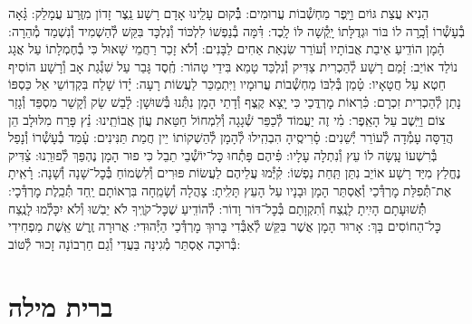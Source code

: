 \documentclass[twoside, openany, parskip=half, 11pt]{book}
\begin{document}
הֵנִיא עֲצַת גּוֹיִם וַיָּֽפֶר מַחְשְׁ֯בוֹת עֲרוּמִים: \hfill \break
בְּ֯֗קוּם עָלֵֽינוּ אָדָם רָשָׁע נֵֽצֶר זָדוֹן מִזֶּֽרַע עֲמָלֵק: \hfill \break
גָּ֗אָה בְ֯עָשְׁ֯רוֹ וְ֯כָֽרָה לוֹ בּוֹר וּגְדֻלָּתוֹ יָֽקְ֯שָׁה לּוֹ לָֽכֶד: \hfill \break
דִּ֗מָּה בְ֯נַפְשׁוֹ לִלְכּוֹד וְ֯נִלְכָּד בִּקֵּשׁ לְ֯הַשְׁמִיד וְ֯נִשְׁמַד מְ֯הֵרָה: \hfill \break
הָ֗מָן הוֹדִֽיעַ אֵיבַת אֲבוֹתָיו וְ֯עוֹרֵר שִׂנְאַת אַחִים לַבָּנִים: \hfill \break
וְ֯֗לֹא זָכַר רַחֲמֵי שָׁאוּל כִּי בְ֯חֶמְלָתוֹ עַל אֲגָג נוֹלַד אוֹיֵב: \hfill \break
זָ֗מַם רָשָׁע לְ֯הַכְרִית צַדִּיק וְ֯נִלְכַּד טָמֵא בִּידֵי טָהוֹר: \hfill \break
חֶֽ֗סֶד גָּבַר עַל שִׁגְ֯גַת אָב וְ֯רָשָׁע הוֹסִיף חֵטְא עַל חֲטָאָיו: \hfill \break
טָ֗מַן בְּ֯לִבּוֹ מַחְשְׁ֯בוֹת עֲרוּמָיו וַיִּתְמַכֵּר לַעֲשׂוֹת רָעָה: \hfill \break
יָ֗דוֹ שָׁלַח בִּקְדֽוֹשֵי אֵל כַּסְפּוֹ נָתַן לְ֯הַכְרִית זִכְרָם: \hfill \break
כִּ֗רְאוֹת מׇרְדֳּכַי כִּי יָֽצָא קֶֽצֶף וְ֯דָתֵי הָמָן נִתְּ֯נוּ בְּ֯שׁוּשָׁן: \hfill \break
לָ֗בַשׁ שַׂק וְ֯קָשַׁר מִסְפֵּד וְ֯גָזַר צוֹם וַיֵּֽשֶׁב עַל הָאֵֽפֶר: \hfill \break
מִ֗י זֶה יַעֲמוֹד לְ֯כַפֵּר שְׁ֯גָגָה וְ֯לִמְחוֹל חַטַּאת עֲוֹן אֲבוֹתֵֽינוּ: \hfill \break
נֵ֗ץ פָּרַח מִלּוּלָב הֵן הֲדַסָּה עָמְ֯דָה לְ֯עוֹרֵר יְ֯שֵׁנִים: \hfill \break
סָ֗רִיסֶֽיהָ הִבְהִֽילוּ לְ֯הָמָן לְ֯הַשְׁקוֹתוֹ יֵין חֲמַת תַּנִּינִים: \hfill \break
עָ֗מַד בְ֯עָשְׁ֯רוֹ וְ֯נָפַל בְּ֯רִשְׁעוֹ עָֽשָׂה לוֹ עֵץ וְ֯נִתְלָה עָלָיו: \hfill \break
פִּ֗יהֶם פָּתְ֯חוּ כׇּל־יוֹשְׁ֯בֵי תֵבֵל כִּי פוּר הָמָן נֶהְפַּךְ לְ֯פוּרֵֽנוּ: \hfill \break
צַ֗דִּיק נֶחֱלַץ מִיַּד רָשָׁע אוֹיֵב נִתַּן תַּֽחַת נַפְשׁוֹ: \hfill \break
קִ֗יְּ֯מוּ עֲלֵיהֶם לַעֲשׂוֹת פּוּרִים וְ֯לִשְׂמוֹחַ בְּ֯כׇל־שָׁנָה וְ֯שָׁנָה: \hfill \break
רָ֗אִֽיתָ אֶת־תְּ֯פִלַּת מׇרְדְּ֯כַי וְ֯אֶסְתֵּר הָמָן וּבָנָיו עַל הָעֵץ תָּלִֽיתָ: \hfill \break
{}
צָהֲלָה וְ֯שָׂמֵֽחָה בִּרְאוֹתָם יַֽחַד תְּ֯כֵֽלֶת מׇרְדְּ֯כָי: \hfill \break
תְּ֯֗שׁוּעָתָם הָיִֽיתָ לָנֶֽצַח וְ֯תִקְוָתָם בְּ֯כׇל־דּוֹר וָדוֹר: \hfill \break
לְ֯הוֹדִֽיעַ שֶׁכׇּל־קֹוֶֽיךָ לֹא יֵבֹֽשׁוּ וְ֯לֹא יִכָּלְ֯מוּ לָנֶֽצַח כׇּל־הַחוֹסִים בָּךְ: \hfill \break
אָרוּר הָמָן אֲשֶׁר בִּקֵּשׁ לְ֯אַבְּ֯דִי בָּרוּךְ מׇרְדְּ֯כַי הַיְּ֯הוּדִי: \hfill \break
אֲרוּרָה זֶֽרֶשׁ אֵֽשֶׁת מַפְחִידִי בְּ֯רוּכָה אֶסְתֵּר מְ֯גִינָּה בַּעֲדִי וְ֯גַם חַרְבוֹנָה זָכוּר לְ֯טּוֹב:

\vfill


\sepline



\chapter[ברית מילה]{ ברית מילה }
\end{document}

